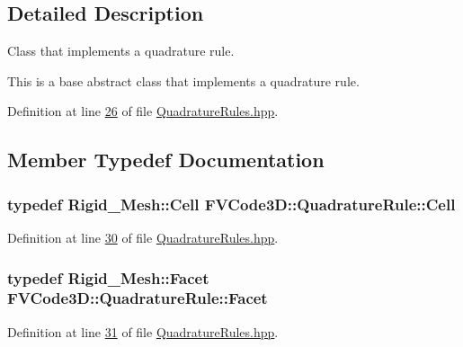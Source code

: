 \subsection{Detailed Description}
Class that implements a quadrature rule. 

This is a base abstract class that implements a quadrature rule. 

Definition at line \hyperlink{QuadratureRules_8hpp_source_l00026}{26} of file \hyperlink{QuadratureRules_8hpp_source}{Quadrature\+Rules.\+hpp}.



\subsection{Member Typedef Documentation}
\subsubsection[{\texorpdfstring{Cell}{Cell}}]{\setlength{\rightskip}{0pt plus 5cm}typedef {\bf Rigid\+\_\+\+Mesh\+::\+Cell} {\bf F\+V\+Code3\+D\+::\+Quadrature\+Rule\+::\+Cell}}\hypertarget{classFVCode3D_1_1QuadratureRule_af2f37bb8e8b8c3fd7554eaacaf4e5f3c}{}\label{classFVCode3D_1_1QuadratureRule_af2f37bb8e8b8c3fd7554eaacaf4e5f3c}


Definition at line \hyperlink{QuadratureRules_8hpp_source_l00030}{30} of file \hyperlink{QuadratureRules_8hpp_source}{Quadrature\+Rules.\+hpp}.

\subsubsection[{\texorpdfstring{Facet}{Facet}}]{\setlength{\rightskip}{0pt plus 5cm}typedef {\bf Rigid\+\_\+\+Mesh\+::\+Facet} {\bf F\+V\+Code3\+D\+::\+Quadrature\+Rule\+::\+Facet}}\hypertarget{classFVCode3D_1_1QuadratureRule_af6e825c3626d437e50e5da733cd0ca1b}{}\label{classFVCode3D_1_1QuadratureRule_af6e825c3626d437e50e5da733cd0ca1b}


Definition at line \hyperlink{QuadratureRules_8hpp_source_l00031}{31} of file \hyperlink{QuadratureRules_8hpp_source}{Quadrature\+Rules.\+hpp}.

